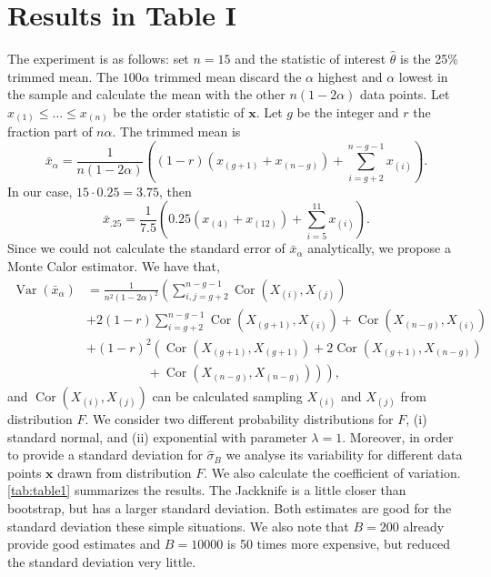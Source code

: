 \documentclass[a4paper,10pt, notitlepage]{report}
\newcommand{\var}{\operatorname{Var}}
\newcommand{\cor}{\operatorname{Cor}}
\begin{document}
\section*{Results in Table I}

The experiment is as follows: set $n=15$ and the statistic of interest
$\hat{\theta}$ is the 25\% trimmed mean. The $100\alpha$ trimmed mean discard
the $\alpha$ highest and $\alpha$ lowest in the sample and calculate the mean
with the other $n(1 - 2\alpha)$ data points. Let $x_{(1)} \le \dots \le
x_{(n)}$ be the order statistic of $\boldsymbol{x}$. Let $g$ be the integer
and $r$ the fraction part of $n\alpha$. The trimmed mean is 
$$
\bar{x}_{\alpha} = \frac{1}{n(1-2\alpha)} \left((1-r)(x_{(g+1)} + x_{(n-g)}) + \sum_{i=g+2}^{n-g-1} x_{(i)}\right).
$$
In our case, $15\cdot 0.25 = 3.75$, then 
$$
\bar{x}_{.25} = \frac{1}{7.5}\left(0.25(x_{(4)} + x_{(12)}) + \sum_{i=5}^{11} x_{(i)}\right).
$$
Since we could not calculate the standard error of $\bar{x}_{\alpha}$
analytically, we propose a Monte Calor estimator. We have that, 
\begin{align*}
  \var(\bar{x}_{\alpha}) &= \frac{1}{n^2(1-2\alpha)^2}\left(\sum_{i,j=g+2}^{n-g-1} \cor(X_{(i)}, X_{(j)}) \right. \\
  &+ \left. 2(1-r)\sum_{i=g+2}^{n-g-1} \cor(X_{(g+1)}, X_{(i)}) + \cor(X_{(n-g)}, X_{(i)})\right. \\ 
  &+ \left. (1-r)^2\left(\cor(X_{(g+1)}, X_{(g+1)}) + 2\cor(X_{(g+1)}, X_{(n-g)}) \right. \right. \\
  &\hspace{2cm} + \left. \left. \cor(X_{(n-g)}, X_{(n-g)})\right)\right),
\end{align*}
and $\cor(X_{(i)}, X_{(j)})$ can be calculated sampling $X_{(i)}$ and
$X_{(j)}$ from distribution $F$. We consider two different probability
distributions for $F$, (i) standard normal, and (ii) exponential with
parameter $\lambda = 1$. Moreover, in order to provide a standard deviation for $\hat{\sigma}_B$ we
analyse its variability for different data points $\boldsymbol{x}$ drawn from
distribution $F$. We also calculate the coefficient of variation.
\autoref{tab:table1} summarizes the results. The Jackknife is a little closer
than bootstrap, but has a larger standard deviation.  Both estimates are good
for the standard deviation these simple situations. We also note that $B=200$
already provide good estimates and $B=10000$ is 50 times more expensive, but
reduced the standard deviation very little.
\end{document}
